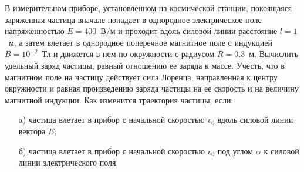 
В измерительном приборе, установленном на космической станции, покоящаяся заряженная частица вначале 
попадает в однородное электрическое поле напряженностью $E=400$~В/м и проходит вдоль силовой линии 
расстояние $l=1$~м,  а затем влетает в однородное поперечное магнитное поле с индукцией $B=10^{-2}$~Тл и 
движется в нем по окружности с радиусом $R=0.3$~м. Вычислить удельный заряд частицы, равный отношению ее заряда к массе. 
Учесть, что в магнитном поле на частицу действует сила Лоренца, направленная к центру окружности и равная 
произведению заряда частицы на ее скорость и на величину магнитной индукции. Как изменится траектория частицы, если:

\begin{enumerate}
    \item[a)] частица влетает в прибор с начальной скоростью $v_0$ вдоль силовой линии вектора $E$;
    \item[б)] частица влетает в прибор с начальной скоростью $v_0$ под углом $\alpha$ к силовой линии электрического поля.
\end{enumerate}